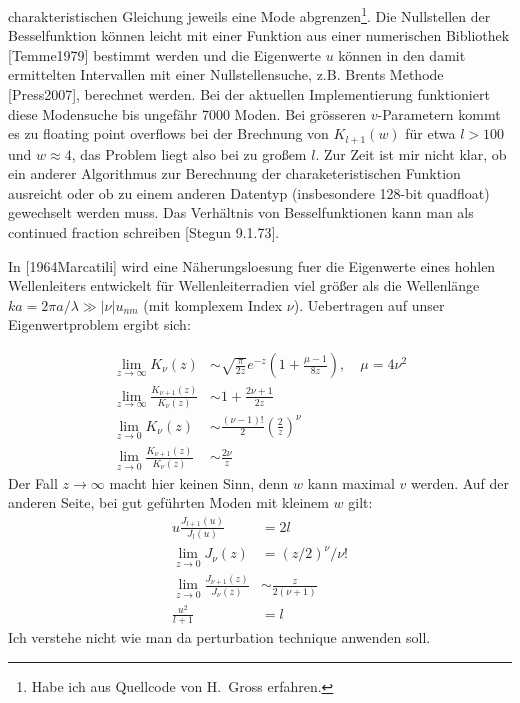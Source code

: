 \documentclass[DIV19,twocolumn]{scrartcl}
\def\({\left(}
\def\){\right)}
\begin{document}
charakteristischen Gleichung jeweils eine Mode abgrenzen\footnote{Habe
  ich aus Quellcode von H.~Gross erfahren.}. Die Nullstellen der
Besselfunktion k\"onnen leicht mit einer Funktion aus einer
numerischen Bibliothek [Temme1979] bestimmt werden und die Eigenwerte
$u$ k\"onnen in den damit ermittelten Intervallen mit einer
Nullstellensuche, z.B. Brents Methode [Press2007], berechnet werden.
Bei der aktuellen Implementierung funktioniert diese Modensuche bis
ungef\"ahr 7000 Moden. Bei gr\"osseren $v$-Parametern kommt es zu
floating point overflows bei der Brechnung von $K_{l+1}(w)$ f\"ur etwa
$l>100$ und $w\approx 4$, das Problem liegt also bei zu gro\ss em
$l$. Zur Zeit ist mir nicht klar, ob ein anderer Algorithmus zur
Berechnung der charaketeristischen Funktion ausreicht oder ob zu einem
anderen Datentyp (insbesondere 128-bit quadfloat) gewechselt werden
muss. Das Verh\"altnis von Besselfunktionen kann man als continued
fraction schreiben [Stegun 9.1.73]. 

In [1964Marcatili] wird eine N\"aherungsloesung fuer die Eigenwerte
eines hohlen Wellenleiters entwickelt f\"ur Wellenleiterradien viel
gr\"o\ss er als die Wellenl\"ange $ka = 2\pi a/\lambda \gg |\nu|
u_{nm}$ (mit komplexem Index $\nu$). Uebertragen auf unser
Eigenwertproblem ergibt sich:

\begin{align}
  \lim_{z\rightarrow \infty} K_\nu(z) &\sim \sqrt{\frac{\pi}{2z}} e^{-z}\(1+\frac{\mu-1}{8z}\), \quad \mu=4\nu^2 \\ %
  \lim_{z\rightarrow \infty} \frac{K_{\nu+1}(z)}{K_{\nu}(z)} &\sim 1+\frac{2\nu+1}{2z} \\
  \lim_{z\rightarrow 0} K_\nu(z) &\sim \frac{(\nu-1)!}{2} \(\frac{2}{z}\)^\nu \\ %
  \lim_{z\rightarrow 0     } \frac{K_{\nu+1}(z)}{K_{\nu}(z)} &\sim \frac{2\nu}{z}
\end{align}
Der Fall $z\rightarrow \infty$ macht hier keinen Sinn, denn $w$ kann
maximal $v$ werden.
Auf der anderen Seite, bei gut gef\"uhrten Moden mit kleinem $w$ gilt:
\begin{align}
  u\frac{J_{l+1}(u)}{J_l(u)}&=2l \\
  \lim_{z\rightarrow 0} J_\nu(z) &= (z/2)^\nu/\nu!  \\
    \lim_{z\rightarrow 0} \frac{J_{\nu+1}(z)}{J_{\nu}(z)} &\sim \frac{z}{2(\nu+1)} \\
    \frac{u^2}{l+1} &= l
\end{align}
Ich verstehe nicht wie man da perturbation technique anwenden soll.
\end{document}
